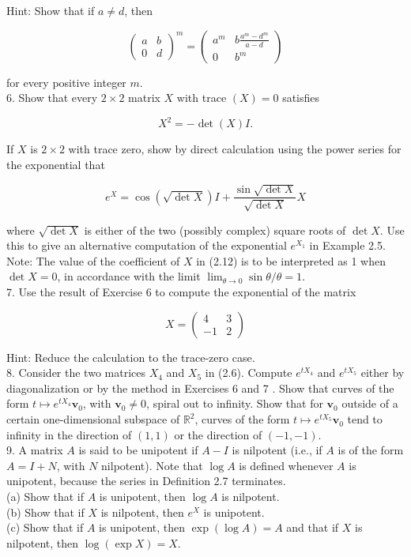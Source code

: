 \documentclass[10pt, letterpaper]{article}
\begin{document}
Hint: Show that if $a \neq d$, then

$$
\left(\begin{array}{ll}
a & b \\
0 & d
\end{array}\right)^{m}=\left(\begin{array}{cc}
a^{m} & b \frac{a^{m}-d^{m}}{a-d} \\
0 & b^{m}
\end{array}\right)
$$

for every positive integer $m$.\\
6. Show that every $2 \times 2$ matrix $X$ with trace $(X)=0$ satisfies

$$
X^{2}=-\operatorname{det}(X) I .
$$

If $X$ is $2 \times 2$ with trace zero, show by direct calculation using the power series for the exponential that

$$
e^{X}=\cos (\sqrt{\operatorname{det} X}) I+\frac{\sin \sqrt{\operatorname{det} X}}{\sqrt{\operatorname{det} X}} X
$$

where $\sqrt{\operatorname{det} X}$ is either of the two (possibly complex) square roots of $\operatorname{det} X$. Use this to give an alternative computation of the exponential $e^{X_{1}}$ in Example 2.5. Note: The value of the coefficient of $X$ in (2.12) is to be interpreted as 1 when $\operatorname{det} X=0$, in accordance with the limit $\lim _{\theta \rightarrow 0} \sin \theta / \theta=1$.\\
7. Use the result of Exercise 6 to compute the exponential of the matrix

$$
X=\left(\begin{array}{rr}
4 & 3 \\
-1 & 2
\end{array}\right)
$$

Hint: Reduce the calculation to the trace-zero case.\\
8. Consider the two matrices $X_{4}$ and $X_{5}$ in (2.6). Compute $e^{t X_{4}}$ and $e^{t X_{5}}$ either by diagonalization or by the method in Exercises 6 and 7 . Show that curves of the form $t \mapsto e^{t X_{4}} \mathbf{v}_{0}$, with $\mathbf{v}_{0} \neq 0$, spiral out to infinity. Show that for $\mathbf{v}_{0}$ outside of a certain one-dimensional subspace of $\mathbb{R}^{2}$, curves of the form $t \mapsto e^{t X_{5}} \mathbf{v}_{0}$ tend to infinity in the direction of $(1,1)$ or the direction of $(-1,-1)$.\\
9. A matrix $A$ is said to be unipotent if $A-I$ is nilpotent (i.e., if $A$ is of the form $A=I+N$, with $N$ nilpotent). Note that $\log A$ is defined whenever $A$ is unipotent, because the series in Definition 2.7 terminates.\\
(a) Show that if $A$ is unipotent, then $\log A$ is nilpotent.\\
(b) Show that if $X$ is nilpotent, then $e^{X}$ is unipotent.\\
(c) Show that if $A$ is unipotent, then $\exp (\log A)=A$ and that if $X$ is nilpotent, then $\log (\exp X)=X$.
\end{document}
